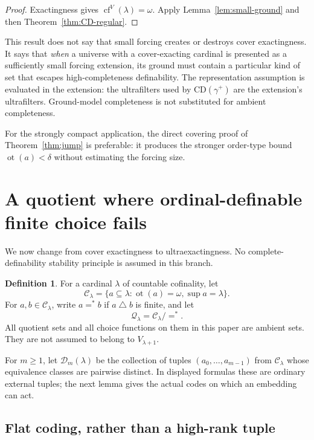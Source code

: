 \documentclass[11pt,letterpaper]{article}
\theoremstyle{definition}
\newtheorem{definition}{Definition}[section]
\newcommand{\cf}{\operatorname{cf}}
\newcommand{\ot}{\operatorname{ot}}
\newcommand{\CD}{\mathrm{CD}}
\newcommand{\CC}{\mathcal C}
\newcommand{\QQ}{\mathcal Q}
\newcommand{\DD}{\mathcal D}
\newcommand{\fineq}{\mathrel{=^{*}}}
\begin{document}
\begin{proof}
Exactingness gives $\cf^V(\lambda)=\omega$. Apply Lemma~\ref{lem:small-ground} and then Theorem~\ref{thm:CD-regular}.
\end{proof}

This result does not say that small forcing creates or destroys cover exactingness. It says that \emph{when} a universe with a cover-exacting cardinal is presented as a sufficiently small forcing extension, its ground must contain a particular kind of set that escapes high-completeness definability. The representation assumption is evaluated in the extension: the ultrafilters used by $\CD(\gamma^+)$ are the extension's ultrafilters. Ground-model completeness is not substituted for ambient completeness.

For the strongly compact application, the direct covering proof of Theorem~\ref{thm:jump} is preferable: it produces the stronger order-type bound $\ot(a)<\delta$ without estimating the forcing size.

\section{A quotient where ordinal-definable finite choice fails}\label{sec:quotient}

We now change from cover exactingness to ultraexactingness. No complete-definability stability principle is assumed in this branch.

\begin{definition}\label{def:quotient}
For a cardinal $\lambda$ of countable cofinality, let
\[
 \CC_\lambda=\{a\subseteq\lambda:\ot(a)=\omega,
                                  \sup a=\lambda\}.
\]
For $a,b\in\CC_\lambda$, write $a\fineq b$ if $a\mathbin\triangle b$ is finite, and let
\[
 \QQ_\lambda=\CC_\lambda/{=^*}.
\]
All quotient sets and all choice functions on them in this paper are ambient sets. They are not assumed to belong to $V_{\lambda+1}$.
\end{definition}

For $m\geq1$, let $\DD_m(\lambda)$ be the collection of tuples $(a_0,\ldots,a_{m-1})$ from $\CC_\lambda$ whose equivalence classes are pairwise distinct. In displayed formulas these are ordinary external tuples; the next lemma gives the actual codes on which an embedding can act.

\subsection{Flat coding, rather than a high-rank tuple}
\end{document}
